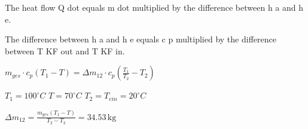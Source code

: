 The heat flow Q dot equals m dot multiplied by the difference between h a and h e.  

The difference between h a and h e equals c p multiplied by the difference between T KF out and T KF in.

\( m_{ges} \cdot c_p (T_1 - T) = \Delta m_{12} \cdot c_p \left( \frac{T_1}{T_2} - T_2 \right) \)  

\( T_1 = 100^\circ C \)  
\( T = 70^\circ C \)  
\( T_2 = T_{ein} = 20^\circ C \)  

\( \Delta m_{12} = \frac{m_{ges} (T_1 - T)}{T_2 - T_2} = 34.53 \, \text{kg} \)
